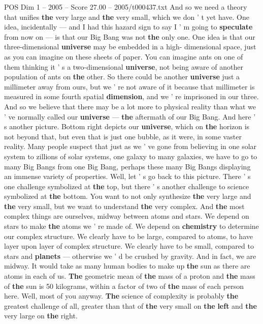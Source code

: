 \begin{textsample}{POS Dim 1 – 2005 – Score 27.00 – 2005/t000437.txt}
And so we need a theory that unifies \textbf{the} very large and \textbf{the} very small, which we don ' t yet have.
One idea, incidentally — and I had this hazard sign to say I ' m going to \textbf{speculate} from now on — is that our Big Bang was not \textbf{the} only one.
One idea is that our three-dimensional \textbf{universe} may be embedded in a high- dimensional space, just as you can imagine on these sheets of paper.
You can imagine ants on one of them thinking it ' s a two-dimensional \textbf{universe}, not being aware of another population of ants on \textbf{the} other.
So there could be another \textbf{universe} just a millimeter away from ours, but we ' re not aware of it because that millimeter is measured in some fourth spatial \textbf{dimension}, and we ' re imprisoned in our three.
And so we believe that there may be a lot more to physical reality than what we ' ve normally called our \textbf{universe} — \textbf{the} aftermath of our Big Bang.
And here ' s another picture.
Bottom right depicts our \textbf{universe}, which on \textbf{the} horizon is not beyond that, but even that is just one bubble, as it were, in some vaster reality.
Many people suspect that just as we ' ve gone from believing in one solar system to zillions of solar systems, one galaxy to many galaxies, we have to go to many Big Bangs from one Big Bang, perhaps these many Big Bangs displaying an immense variety of properties.
Well, let ' s go back to this picture.
There ' s one challenge symbolized at \textbf{the} top, but there ' s another challenge to science symbolized at \textbf{the} bottom.
You want to not only synthesize \textbf{the} very large and \textbf{the} very small, but we want to understand \textbf{the} very complex.
And \textbf{the} most complex things are ourselves, midway between atoms and stars.
We depend on stars to make \textbf{the} atoms we ' re made of.
We depend on \textbf{chemistry} to determine our complex structure.
We clearly have to be large, compared to atoms, to have layer upon layer of complex structure.
We clearly have to be small, compared to stars and \textbf{planets} — otherwise we ' d be crushed by gravity.
And in fact, we are midway.
It would take as many human bodies to make up \textbf{the} sun as there are atoms in each of us. \textbf{The} geometric mean of \textbf{the} mass of a proton and \textbf{the} mass of \textbf{the} sun is 50 kilograms, within a factor of two of \textbf{the} mass of each person here.
Well, most of you anyway. \textbf{The} science of complexity is probably \textbf{the} greatest challenge of all, greater than that of \textbf{the} very small on \textbf{the} \textbf{left} and \textbf{the} very large on \textbf{the} right.

\end{textsample}

